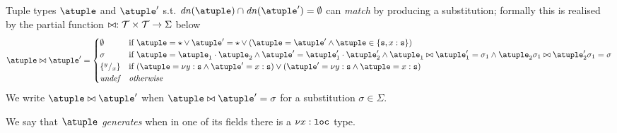 Tuple types $\atuple$ and $\atuple'$ s.t.
$\dn{\atuple}\cap\dn{\atuple'} = \emptyset$
can \emph{match} by producing a substitution; formally
this is realised by the partial function
$\matches : \tupleset \times \tupleset \to \Sigma$ below
\[
  \atuple \matches \atuple' \generates
    \begin{cases}
     \emptyset
    & 
    \text{if  } \atuple = \wildcard \vee \atuple' = \wildcard  \vee (\atuple = \atuple' \land \atuple\in\{\asort, x : \asort\})
    \\
    \sigma
    &
    \text{if } \atuple = \atuple_1 \cdot \atuple_2
    \land  \atuple' = \atuple'_1 \cdot \atuple'_2
    \land \atuple_1 \matches \atuple'_1 \generates \sigma_1
    \land \atuple_2\sigma_1 \matches \atuple'_2\sigma_1 \generates \sigma
    \\
    \sust x y 
    &
    \text{if  } (\atuple = \nu y : \asort \land \atuple' = x: \asort) \vee  (\atuple' = \nu y : \asort \land \atuple = x: \asort) 
    \\
    \textit{undef} & \textit{otherwise}
   \end{cases}
\]
%
We write $\atuple \matches \atuple'$ when
$\atuple \matches \atuple' = \sigma$ for a substitution
$\sigma \in \Sigma$.
%
%
%

\noindent
We say that $\atuple$ \emph{generates} when in one of its fields there
is a $\nu x: \asort[loc]$ type. 
%

%


